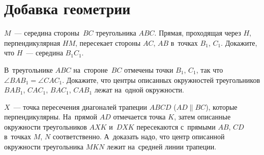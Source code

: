 
\section*{Добавка геометрии}


\begin{problems}

\item
$M$~--- середина стороны~$BC$ треугольника $ABC$.
Прямая, проходящая через $H$, перпендикулярная $HM$, пересекает стороны $AC$,
$AB$ в~точках $B_1$, $C_1$.
Докажите, что $H$~--- середина $B_1C_1$.

\item
В~треугольнике $ABC$ на~стороне~$BC$ отмечены точки $B_1$, $C_1$, так что
$\angle B A B_1 = \angle C A C_1$.
Докажите, что центры описанных окружностей треугольников $B A B_1$, $C A C_1$,
$B A C_1$, $C A B_1$ лежат на~одной окружности.

\item
$X$~--- точка пересечения диагоналей трапеции $ABCD$ ($AD \parallel BC$),
которые перпендикулярны.
На~прямой $AD$ отмечается точка $K$, затем описанные окружности треугольников
$AXK$ и~$DXK$ пересекаются с~прямыми $AB$, $CD$ в~точках $M$, $N$
соответственно.
А~доказать надо, что центр описанной окружности треугольника $MKN$ лежит
на~средней линии трапеции.

\end{problems}

